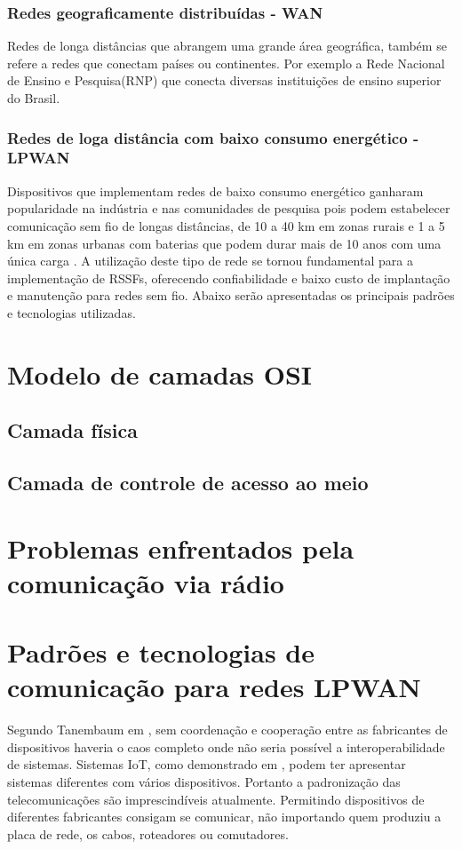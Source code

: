 \subsubsection*{Redes geograficamente distribuídas - WAN}
Redes de longa distâncias que abrangem uma grande área geográfica, também se refere a redes que conectam países ou continentes. Por exemplo a Rede Nacional de Ensino e Pesquisa(RNP) que conecta diversas instituições de ensino superior do Brasil.

\subsubsection*{Redes de loga distância com baixo consumo energético - LPWAN}
Dispositivos que implementam redes de baixo consumo energético ganharam popularidade na indústria e nas comunidades de pesquisa pois podem estabelecer comunicação sem fio de longas distâncias, de 10 a 40 km em zonas rurais e 1 a 5 km em zonas urbanas com baterias que podem durar mais de 10 anos com uma única carga \cite{mekki2019comparative}. A utilização deste tipo de rede se tornou fundamental para a implementação de RSSFs, oferecendo confiabilidade e baixo custo de implantação e manutenção para redes sem fio. Abaixo serão apresentadas os principais padrões e tecnologias utilizadas.

\section{Modelo de camadas OSI}
\label{osi}
\subsection{Camada física}
\subsection{Camada de controle de acesso ao meio}

\section{Problemas enfrentados pela comunicação via rádio}


\section{Padrões e tecnologias de comunicação para redes LPWAN}
\label{padrõesSF}
Segundo Tanembaum em \cite{tanembaum2011}, sem coordenação e cooperação entre as fabricantes de dispositivos haveria o caos completo onde não seria possível a interoperabilidade de sistemas. Sistemas IoT, como demonstrado em \cite{sotres2017practical}, podem ter apresentar sistemas diferentes com vários dispositivos. Portanto a padronização das telecomunicações são imprescindíveis atualmente. Permitindo dispositivos de diferentes fabricantes consigam se comunicar, não importando quem produziu a placa de rede, os cabos, roteadores ou comutadores.

